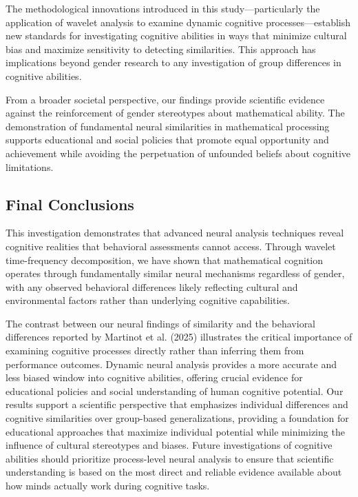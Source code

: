 \documentclass[pdflatex,sn-nature]{sn-jnl}%
\theoremstyle{thmstyleone}%
\theoremstyle{thmstyletwo}%
\theoremstyle{thmstylethree}%
\begin{document}
The methodological innovations introduced in this study—particularly the application of wavelet analysis to examine dynamic cognitive processes—establish new standards for investigating cognitive abilities in ways that minimize cultural bias and maximize sensitivity to detecting similarities. This approach has implications beyond gender research to any investigation of group differences in cognitive abilities.

From a broader societal perspective, our findings provide scientific evidence against the reinforcement of gender stereotypes about mathematical ability. The demonstration of fundamental neural similarities in mathematical processing supports educational and social policies that promote equal opportunity and achievement while avoiding the perpetuation of unfounded beliefs about cognitive limitations.


\subsection{Final Conclusions}
This investigation demonstrates that advanced neural analysis techniques reveal cognitive realities that behavioral assessments cannot access. Through wavelet time-frequency decomposition, we have shown that mathematical cognition operates through fundamentally similar neural mechanisms regardless of gender, with any observed behavioral differences likely reflecting cultural and environmental factors rather than underlying cognitive capabilities.

The contrast between our neural findings of similarity and the behavioral differences reported by Martinot et al. (2025)\cite{martinot2025mathematical} illustrates the critical importance of examining cognitive processes directly rather than inferring them from performance outcomes. Dynamic neural analysis provides a more accurate and less biased window into cognitive abilities, offering crucial evidence for educational policies and social understanding of human cognitive potential.
Our results support a scientific perspective that emphasizes individual differences and cognitive similarities over group-based generalizations, providing a foundation for educational approaches that maximize individual potential while minimizing the influence of cultural stereotypes and biases. Future investigations of cognitive abilities should prioritize process-level neural analysis to ensure that scientific understanding is based on the most direct and reliable evidence available about how minds actually work during cognitive tasks.
\end{document}
